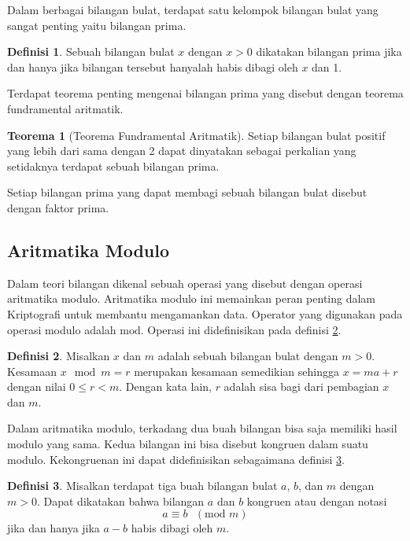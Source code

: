 \documentclass[10pt,conference]{IEEEtran}
\theoremstyle{definition}
\newtheorem{definition}{Definisi}[section]
\newtheorem{theorem}{Teorema}[section]
\begin{document}
Dalam berbagai bilangan bulat, terdapat satu kelompok bilangan bulat  yang sangat penting yaitu bilangan prima.
\begin{definition} \label{def:prime}
    Sebuah bilangan bulat $x$ dengan $x > 0$ dikatakan bilangan prima jika dan hanya jika bilangan tersebut hanyalah habis dibagi oleh $x$ dan 1.
\end{definition}

Terdapat teorema penting mengenai bilangan prima yang disebut dengan teorema fundramental aritmatik. \cite{b2}

\begin{theorem}[Teorema Fundramental Aritmatik]
    Setiap bilangan bulat positif yang lebih dari sama dengan 2 dapat dinyatakan sebagai perkalian yang setidaknya terdapat sebuah bilangan prima. 
\end{theorem}

Setiap bilangan prima yang dapat membagi sebuah bilangan bulat disebut dengan faktor prima.

\subsection{Aritmatika Modulo}
Dalam teori bilangan dikenal sebuah operasi yang disebut dengan operasi aritmatika modulo. Aritmatika modulo ini memainkan peran penting dalam Kriptografi untuk membantu
mengamankan data. Operator yang digunakan pada operasi modulo adalah $ \text{mod} $. Operasi ini didefinisikan pada definisi \ref{def:modulo}.

\begin{definition} \label{def:modulo}
    Misalkan $x$ dan $m$ adalah sebuah bilangan bulat dengan $ m > 0 $. Kesamaan $ x \mod{m} = r $ merupakan kesamaan semedikian sehingga $ x = ma + r $ dengan nilai $0 \le r < m$.
    Dengan kata lain, $r$ adalah sisa bagi dari pembagian $x$ dan $m$.
\end{definition}

Dalam aritmatika modulo, terkadang dua buah bilangan bisa saja memiliki hasil modulo yang sama. Kedua bilangan ini bisa disebut kongruen dalam suatu modulo. Kekongruenan ini dapat
didefinisikan sebagaimana definisi \ref{def:congruent}.

\begin{definition} \label{def:congruent}
    Misalkan terdapat tiga buah bilangan bulat $a$, $b$, dan $m$ dengan $m > 0$. Dapat dikatakan bahwa bilangan $a$ dan $b$ kongruen atau dengan notasi
    $$ a \equiv b \text{ } (\text{mod } m) $$
    jika dan hanya jika $a-b$ habis dibagi oleh $m$.
\end{definition}
\end{document}
